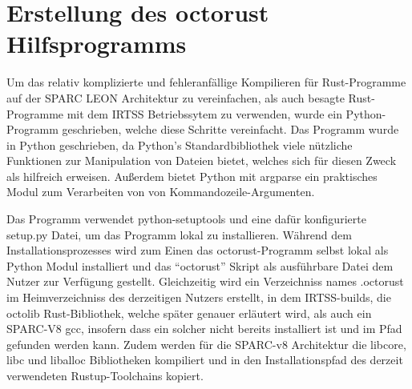 \section{Erstellung des octorust Hilfsprogramms}

Um das relativ komplizierte und fehleranfällige Kompilieren für Rust-Programme auf der SPARC LEON Architektur zu vereinfachen, als
auch besagte Rust-Programme mit dem IRTSS Betriebssytem zu verwenden, wurde ein Python-Programm geschrieben, welche diese Schritte
vereinfacht. Das Programm wurde in Python geschrieben, da Python's Standardbibliothek viele nützliche Funktionen zur Manipulation
von Dateien bietet, welches sich für diesen Zweck als hilfreich erweisen. Außerdem bietet Python mit argparse ein
praktisches Modul zum Verarbeiten von von Kommandozeile-Argumenten.

Das Programm verwendet python-setuptools und eine dafür konfigurierte setup.py Datei, um das Programm lokal zu installieren.
Während dem Installationsprozesses wird zum Einen das octorust-Programm selbst lokal als Python Modul installiert und das
``octorust'' Skript als ausführbare Datei dem Nutzer zur Verfügung gestellt.
Gleichzeitig wird ein Verzeichniss names .octorust
im Heimverzeichniss des derzeitigen Nutzers erstellt, in dem IRTSS-builds, die octolib Rust-Bibliothek, welche später 
genauer erläutert wird, als auch ein SPARC-V8 gcc, insofern dass ein
solcher nicht bereits installiert ist und im Pfad gefunden werden kann.
Zudem werden für die SPARC-v8 Architektur die libcore, libc und liballoc Bibliotheken kompiliert und in den
Installationspfad des derzeit verwendeten Rustup-Toolchains kopiert.

